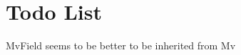 \chapter{Todo List}
\hypertarget{todo}{}\label{todo}

\begin{DoxyRefList}
\item[File \doxylink{MotionInfo_8h}{Motion\+Info.h} ]\label{todo__todo000001}%
%
Mv\+Field seems to be better to be inherited from Mv 
\end{DoxyRefList}